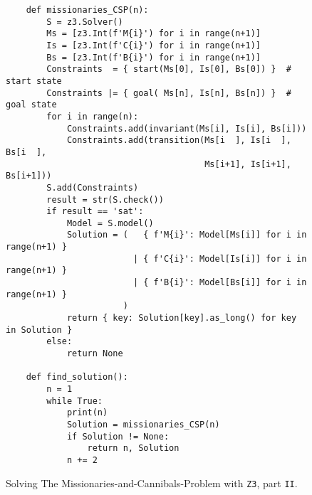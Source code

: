 \begin{figure}[!ht]
\centering
\begin{verbatim}
    def missionaries_CSP(n):
        S = z3.Solver()
        Ms = [z3.Int(f'M{i}') for i in range(n+1)]
        Is = [z3.Int(f'C{i}') for i in range(n+1)]
        Bs = [z3.Int(f'B{i}') for i in range(n+1)]
        Constraints  = { start(Ms[0], Is[0], Bs[0]) }  # start state
        Constraints |= { goal( Ms[n], Is[n], Bs[n]) }  # goal state
        for i in range(n):
            Constraints.add(invariant(Ms[i], Is[i], Bs[i]))
            Constraints.add(transition(Ms[i  ], Is[i  ], Bs[i  ], 
                                       Ms[i+1], Is[i+1], Bs[i+1]))
        S.add(Constraints)
        result = str(S.check())
        if result == 'sat':
            Model = S.model()
            Solution = (   { f'M{i}': Model[Ms[i]] for i in range(n+1) }
                         | { f'C{i}': Model[Is[i]] for i in range(n+1) }
                         | { f'B{i}': Model[Bs[i]] for i in range(n+1) }
                       )
            return { key: Solution[key].as_long() for key in Solution }            
        else:
            return None
    
    def find_solution():
        n = 1
        while True:
            print(n)
            Solution = missionaries_CSP(n)
            if Solution != None:
                return n, Solution
            n += 2    
\end{verbatim}
\vspace*{-0.3cm}
\caption{Solving The Missionaries-and-Cannibals-Problem with \texttt{Z3}, part \texttt{II}.}
\label{fig:Missionaries-Z3.ipynb-2}
\end{figure}

